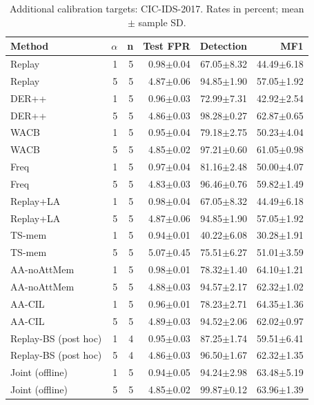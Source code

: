 \begin{table}[t]
\centering\scriptsize
\setlength{\tabcolsep}{3.8pt}
\caption{Additional calibration targets: CIC-IDS-2017. Rates in percent; mean $\pm$ sample SD.}\label{tab:alpha-cic17}
\begin{tabular}{lrrrrr}
\toprule
Method & $\alpha$ & n & Test FPR & Detection & MF1 \\
\midrule
Replay & 1 & 5 & 0.98$\pm$0.04 & 67.05$\pm$8.32 & 44.49$\pm$6.18 \\
Replay & 5 & 5 & 4.87$\pm$0.06 & 94.85$\pm$1.90 & 57.05$\pm$1.92 \\
DER++ & 1 & 5 & 0.96$\pm$0.03 & 72.99$\pm$7.31 & 42.92$\pm$2.54 \\
DER++ & 5 & 5 & 4.86$\pm$0.03 & 98.28$\pm$0.27 & 62.87$\pm$0.65 \\
WACB & 1 & 5 & 0.95$\pm$0.04 & 79.18$\pm$2.75 & 50.23$\pm$4.04 \\
WACB & 5 & 5 & 4.85$\pm$0.02 & 97.21$\pm$0.60 & 61.05$\pm$0.98 \\
Freq & 1 & 5 & 0.97$\pm$0.04 & 81.16$\pm$2.48 & 50.00$\pm$4.07 \\
Freq & 5 & 5 & 4.83$\pm$0.03 & 96.46$\pm$0.76 & 59.82$\pm$1.49 \\
Replay+LA & 1 & 5 & 0.98$\pm$0.04 & 67.05$\pm$8.32 & 44.49$\pm$6.18 \\
Replay+LA & 5 & 5 & 4.87$\pm$0.06 & 94.85$\pm$1.90 & 57.05$\pm$1.92 \\
TS-mem & 1 & 5 & 0.94$\pm$0.01 & 40.22$\pm$6.08 & 30.28$\pm$1.91 \\
TS-mem & 5 & 5 & 5.07$\pm$0.45 & 75.51$\pm$6.27 & 51.01$\pm$3.59 \\
AA-noAttMem & 1 & 5 & 0.98$\pm$0.01 & 78.32$\pm$1.40 & 64.10$\pm$1.21 \\
AA-noAttMem & 5 & 5 & 4.88$\pm$0.03 & 94.57$\pm$2.17 & 62.32$\pm$1.02 \\
AA-CIL & 1 & 5 & 0.96$\pm$0.01 & 78.23$\pm$2.71 & 64.35$\pm$1.36 \\
AA-CIL & 5 & 5 & 4.89$\pm$0.03 & 94.52$\pm$2.06 & 62.02$\pm$0.97 \\
Replay-BS (post hoc) & 1 & 4 & 0.95$\pm$0.03 & 87.25$\pm$1.74 & 59.51$\pm$6.41 \\
Replay-BS (post hoc) & 5 & 4 & 4.86$\pm$0.03 & 96.50$\pm$1.67 & 62.32$\pm$1.35 \\
Joint (offline) & 1 & 5 & 0.94$\pm$0.05 & 94.24$\pm$2.98 & 63.48$\pm$5.19 \\
Joint (offline) & 5 & 5 & 4.85$\pm$0.02 & 99.87$\pm$0.12 & 63.96$\pm$1.39 \\
\bottomrule
\end{tabular}
\end{table}
